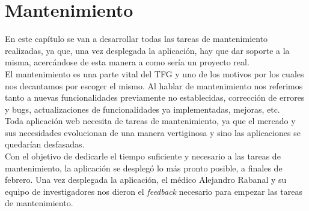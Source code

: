 \chapter{Mantenimiento}

En este capítulo se van a desarrollar todas las tareas de mantenimiento realizadas, ya que, una vez desplegada la aplicación, hay que dar soporte a la misma, acercándose de esta manera a como sería un proyecto real. \\

El mantenimiento es una parte vital del TFG y uno de los motivos por los cuales nos decantamos por escoger el mismo. Al hablar de mantenimiento nos referimos tanto a nuevas funcionalidades previamente no establecidas, corrección de errores y bugs, actualizaciones de funcionalidades ya implementadas, mejoras, etc. \\

Toda aplicación web necesita de tareas de mantenimiento, ya que el mercado y sus necesidades evolucionan de una manera vertiginosa y sino las aplicaciones se quedarían desfasadas. \\

Con el objetivo de dedicarle el tiempo suficiente y necesario a las tareas de mantenimiento, la aplicación se desplegó lo más pronto posible, a finales de febrero.
Una vez desplegada la aplicación, el médico Alejandro Rabanal y su equipo de investigadores nos dieron el \textit{feedback} necesario para empezar las tareas de mantenimiento. \\

